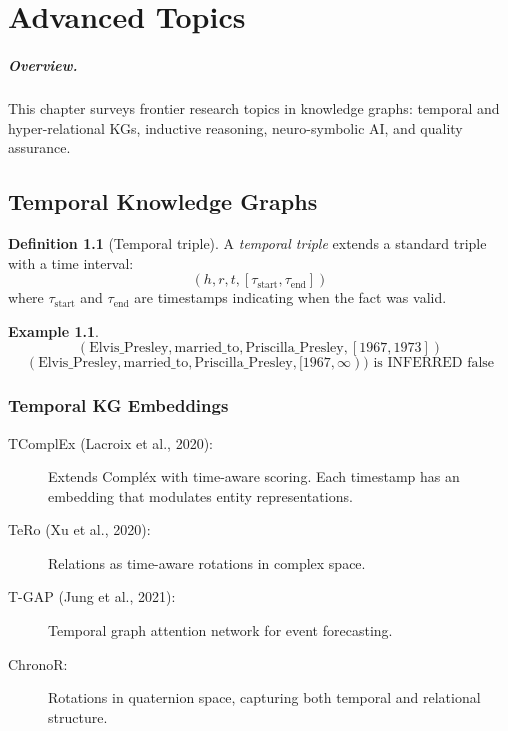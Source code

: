 \documentclass[11pt,a4paper,oneside,openany]{book}
\theoremstyle{definition}
\newtheorem{definition}{Definition}[chapter]
\newtheorem{example}{Example}[chapter]
\theoremstyle{plain}
\theoremstyle{remark}
\begin{document}
\chapter{Advanced Topics}\label{ch:advanced}

\paragraph{Overview.}
This chapter surveys frontier research topics in knowledge graphs: temporal and hyper-relational KGs, inductive reasoning, neuro-symbolic AI, and quality assurance.

\section{Temporal Knowledge Graphs}\label{sec:temporal}

\begin{definition}[Temporal triple]
	A \emph{temporal triple} extends a standard triple with a time interval:
	$$(h, r, t, [\tau_{\text{start}}, \tau_{\text{end}}])$$
	where $\tau_{\text{start}}$ and $\tau_{\text{end}}$ are timestamps indicating when the fact was valid.
\end{definition}

\begin{example}
	$$(\text{Elvis\_Presley}, \text{married\_to}, \text{Priscilla\_Presley}, [1967, 1973])$$
	$$(\text{Elvis\_Presley}, \text{married\_to}, \text{Priscilla\_Presley}, [1967, \infty)) \text{ is INFERRED false}$$
\end{example}

\subsection{Temporal KG Embeddings}

\begin{description}
	\item[TComplEx (Lacroix et al., 2020):] Extends Compl\'{e}x with time-aware scoring. Each timestamp has an embedding that modulates entity representations.
	\item[TeRo (Xu et al., 2020):] Relations as time-aware rotations in complex space.
	\item[T-GAP (Jung et al., 2021):] Temporal graph attention network for event forecasting.
	\item[ChronoR:] Rotations in quaternion space, capturing both temporal and relational structure.
\end{description}
\end{document}
